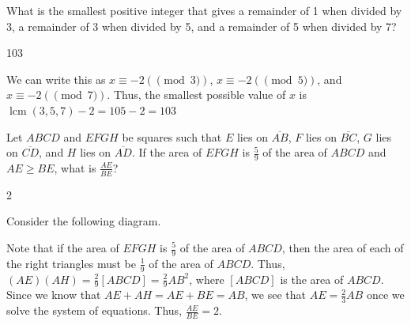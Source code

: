 \documentclass[11pt]{article}
\DeclareMathOperator{\lcm}{lcm}
\begin{document}
\begin{problem}
 What is the smallest positive integer that gives a remainder of 1 when divided by 3, a remainder of 3 when divided by 5, and a remainder of 5 when divided by 7?
\end{problem}

\begin{answer}
103
\end{answer}

\begin{solution}
We can write this as $x \equiv -2 (\pmod 3)$, $x \equiv -2 (\pmod 5)$, and $x \equiv -2 (\pmod 7)$. Thus, the smallest possible value of $x$ is $\lcm (3, 5, 7) - 2 = 105-2 = \boxed{103}$
\end{solution}


\begin{problem}
Let $ABCD$ and $EFGH$ be squares such that $E$ lies on $\overline{AB}$, $F$ lies on $\overline{BC}$, $G$ lies on $\overline{CD}$, and $H$ lies on $\overline{AD}$. If the area of $EFGH$ is $\frac{5}{9}$ of the area of $ABCD$ and $AE \geq BE$, what is $\frac{AE}{BE}$? %
\end{problem}

\begin{answer}
2
\end{answer}

\begin{solution}
Consider the following diagram.
\begin{center}
\end{center}
Note that if the area of $EFGH$ is $\frac{5}{9}$ of the area of $ABCD$, then the area of each of the right triangles must be $\frac{1}{9}$ of the area of $ABCD$. Thus, $(AE)(AH) = \frac{2}{9}[ABCD]=\frac{2}{9}AB^2$, where $[ABCD]$ is the area of $ABCD$. Since we know that $AE + AH = AE + BE = AB$, we see that $AE=\frac{2}{3}AB$ once we solve the system of equations. Thus, $\frac{AE}{BE} = \boxed{2}$.
\end{solution}
\end{document}
